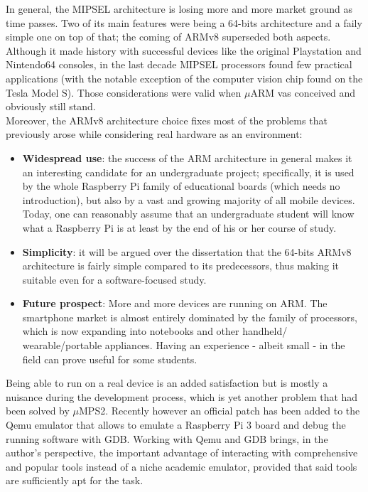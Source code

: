\documentclass[12pt,a4paper,openright,twoside]{report}
\begin{document}
In general, the MIPSEL architecture is losing more and more market ground as time
passes. Two of its main features were being a 64-bits architecture and a faily simple
one on top of that; the coming of ARMv8 superseded both aspects. Although it made
history with successful devices like the original Playstation and Nintendo64 consoles,
in the last decade MIPSEL processors found few practical applications (with the notable 
exception of the computer vision chip found on the Tesla Model S).
Those considerations were valid when $\mu$ARM vas conceived and obviously still stand.\\

Moreover, the ARMv8 architecture choice fixes most of the problems that 
previously arose while
considering real hardware as an environment:
\begin{itemize}
    \item \textbf{Widespread use}: the success of the ARM architecture in general
            makes it an interesting candidate for an undergraduate project; specifically,
            it is used by the whole Raspberry Pi family of educational boards (which
            needs no introduction), but also by a vast and growing majority of all mobile 
            devices. Today, one can reasonably assume that an undergraduate
            student will know what a Raspberry Pi is at least by the end of his or her
            course of study.
    \item \textbf{Simplicity}: it will be argued over the dissertation that the
            64-bits ARMv8 architecture is fairly simple compared to its predecessors,
            thus making it suitable even for a software-focused study.
    \item \textbf{Future prospect}: More and more devices are running on ARM.
            The smartphone market is almost entirely dominated by the family of
            processors, which is now expanding into notebooks and other handheld/
            wearable/portable appliances.
            Having an experience - albeit small - in the field can prove useful
            for some students.
\end{itemize}
Being able to run on a real device is an added satisfaction but is mostly a 
nuisance during the development process, which is yet another problem that 
had been solved by $\mu$MPS2. Recently however an official patch has been
added to the Qemu emulator that allows to emulate a Raspberry Pi 3 board and 
debug the running software
with GDB. Working with Qemu and GDB brings, in the author's perspective, the
important advantage of interacting with comprehensive and popular tools instead of 
a niche academic emulator, provided that said tools are sufficiently apt for
the task. 
\end{document}

